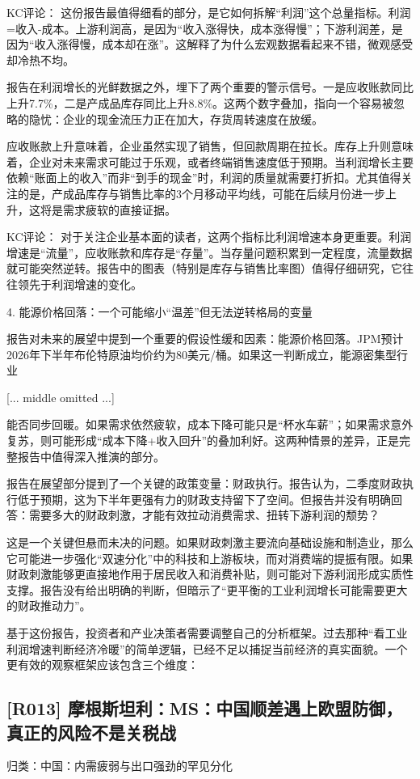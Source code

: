 \documentclass[11pt]{ctexart}
\begin{document}
KC评论： 这份报告最值得细看的部分，是它如何拆解“利润”这个总量指标。利润=收入-成本。上游利润高，是因为“收入涨得快，成本涨得慢”；下游利润差，是因为“收入涨得慢，成本却在涨”。这解释了为什么宏观数据看起来不错，微观感受却冷热不均。

报告在利润增长的光鲜数据之外，埋下了两个重要的警示信号。一是应收账款同比上升7.7\%，二是产成品库存同比上升8.8\%。这两个数字叠加，指向一个容易被忽略的隐忧：企业的现金流压力正在加大，存货周转速度在放缓。

应收账款上升意味着，企业虽然实现了销售，但回款周期在拉长。库存上升则意味着，企业对未来需求可能过于乐观，或者终端销售速度低于预期。当利润增长主要依赖“账面上的收入”而非“到手的现金”时，利润的质量就需要打折扣。尤其值得关注的是，产成品库存与销售比率的3个月移动平均线，可能在后续月份进一步上升，这将是需求疲软的直接证据。

KC评论： 对于关注企业基本面的读者，这两个指标比利润增速本身更重要。利润增速是“流量”，应收账款和库存是“存量”。当存量问题积累到一定程度，流量数据就可能突然逆转。报告中的图表（特别是库存与销售比率图）值得仔细研究，它往往领先于利润增速的变化。

4. 能源价格回落：一个可能缩小“温差”但无法逆转格局的变量

报告对未来的展望中提到一个重要的假设性缓和因素：能源价格回落。JPM预计2026年下半年布伦特原油均价约为80美元/桶。如果这一判断成立，能源密集型行业

[... middle omitted ...]

能否同步回暖。如果需求依然疲软，成本下降可能只是“杯水车薪”；如果需求意外复苏，则可能形成“成本下降+收入回升”的叠加利好。这两种情景的差异，正是完整报告中值得深入推演的部分。

报告在展望部分提到了一个关键的政策变量：财政执行。报告认为，二季度财政执行低于预期，这为下半年更强有力的财政支持留下了空间。但报告并没有明确回答：需要多大的财政刺激，才能有效拉动消费需求、扭转下游利润的颓势？

这是一个关键但悬而未决的问题。如果财政刺激主要流向基础设施和制造业，那么它可能进一步强化“双速分化”中的科技和上游板块，而对消费端的提振有限。如果财政刺激能够更直接地作用于居民收入和消费补贴，则可能对下游利润形成实质性支撑。报告没有给出明确的判断，但暗示了“更平衡的工业利润增长可能需要更大的财政推动力”。

基于这份报告，投资者和产业决策者需要调整自己的分析框架。过去那种“看工业利润增速判断经济冷暖”的简单逻辑，已经不足以捕捉当前经济的真实面貌。一个更有效的观察框架应该包含三个维度：

\subsection{[R013] 摩根斯坦利：MS：中国顺差遇上欧盟防御，真正的风险不是关税战}
{\small\color{refgray}归类：中国：内需疲弱与出口强劲的罕见分化}
\end{document}
